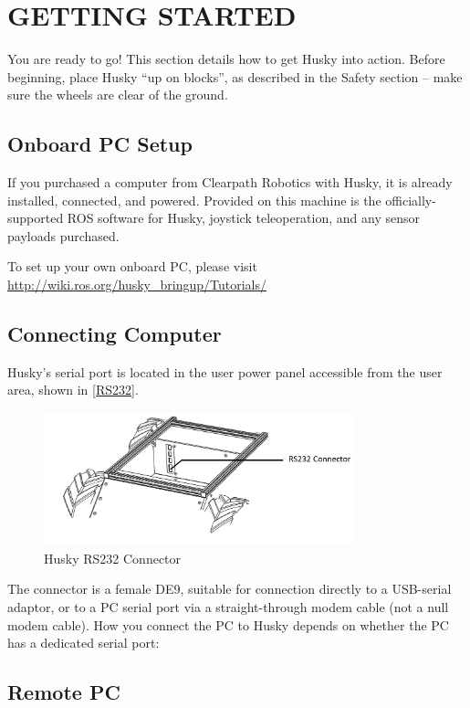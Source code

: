\documentclass[]{clearpath-latex/clearpath-manual}
\begin{document}
\section{GETTING STARTED}

You are ready to go! This section details how to get Husky into action.
Before beginning, place Husky “up on blocks”, as described in the Safety section – make sure the wheels are clear of the ground.


\subsection{Onboard PC Setup}

If you purchased a computer from Clearpath Robotics with Husky, it is already installed, connected, and powered. 
Provided on this machine is the officially-supported ROS software for Husky, joystick teleoperation, and any sensor payloads purchased.

To set up your own onboard PC, please visit \url{http://wiki.ros.org/husky_bringup/Tutorials/}


\subsection{Connecting Computer}

Husky’s serial port is located in the user power panel accessible from the user area, shown in \autoref{RS232}.

\begin{figure}[h]
	\centering
	\includegraphics[width=0.8\textwidth]{RS232.png}
	\caption{Husky RS232 Connector}
	\label{RS232}
\end{figure}

The connector is a female DE9, suitable for connection directly to a USB-serial adaptor, 
or to a PC serial port via a straight-through modem cable (not a null modem cable). 
How you connect the PC to Husky depends on whether the PC has a dedicated serial port:

\subsection{Remote PC}
\end{document}
